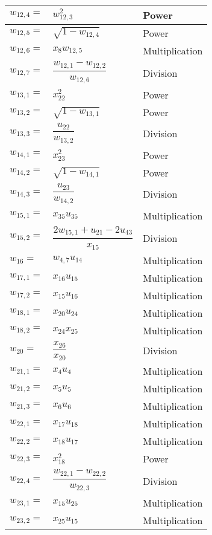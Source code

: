 \begin{longtable}{|p{1.5cm}|l|p{2cm}|}
$w_{12,4}=$ & $ w_{12,3}^{2} $ & Power \\ \hline
$w_{12,5}=$ & $ \sqrt{1-w_{12,4}} $ & Power \\ \hline
$w_{12,6}=$ & $ x_{8}w_{12,5} $ & Multiplication \\ \hline
$w_{12,7}=$ & $ \dfrac{w_{12,1}-w_{12,2}}{w_{12,6}} $ & Division \\ \hline
$w_{13,1}=$ & $ x_{22}^{2} $ & Power \\ \hline
$w_{13,2}=$ & $ \sqrt{1-w_{13,1}} $ & Power \\ \hline
$w_{13,3}=$ & $ \dfrac{u_{22}}{w_{13,2}} $ & Division \\ \hline
$w_{14,1}=$ & $ x_{23}^{2} $ & Power \\ \hline
$w_{14,2}=$ & $ \sqrt{1-w_{14,1}} $ & Power \\ \hline
$w_{14,3}=$ & $ \dfrac{u_{23}}{w_{14,2}} $ & Division \\ \hline
$w_{15,1}=$ & $ x_{35}u_{35} $ & Multiplication \\ \hline 
$w_{15,2}=$ & $ \dfrac{2w_{15,1}+u_{21}-2u_{43}}{x_{15}} $ & Division \\ \hline 
$w_{16}=$ & $ w_{4,7}u_{14} $ & Multiplication \\ \hline
$w_{17,1}=$ & $ x_{16}u_{15} $ & Multiplication \\ \hline
$w_{17,2}=$ & $ x_{15}u_{16} $ & Multiplication \\ \hline
$w_{18,1}=$ & $ x_{20}u_{24} $ & Multiplication \\ \hline
$w_{18,2}=$ & $ x_{24}x_{25} $ & Multiplication \\ \hline
$w_{20}=$ & $ \dfrac{x_{26}}{x_{20}} $ & Division \\ \hline
$w_{21,1}=$ & $ x_{4}u_{4} $ & Multiplication \\ \hline
$w_{21,2}=$ & $ x_{5}u_{5} $ & Multiplication \\ \hline
$w_{21,3}=$ & $ x_{6}u_{6} $ & Multiplication \\ \hline
$w_{22,1}=$ & $ x_{17}u_{18} $ & Multiplication \\ \hline
$w_{22,2}=$ & $ x_{18}u_{17} $ & Multiplication \\ \hline
$w_{22,3}=$ & $ x_{18}^{2} $ & Power \\ \hline
$w_{22,4}=$ & $ \dfrac{w_{22,1}-w_{22,2}}{w_{22,3}} $ & Division \\ \hline
$w_{23,1}=$ & $ x_{15}u_{25} $ & Multiplication \\ \hline
$w_{23,2}=$ & $ x_{25}u_{15} $ & Multiplication \\ \hline

\end{longtable}
